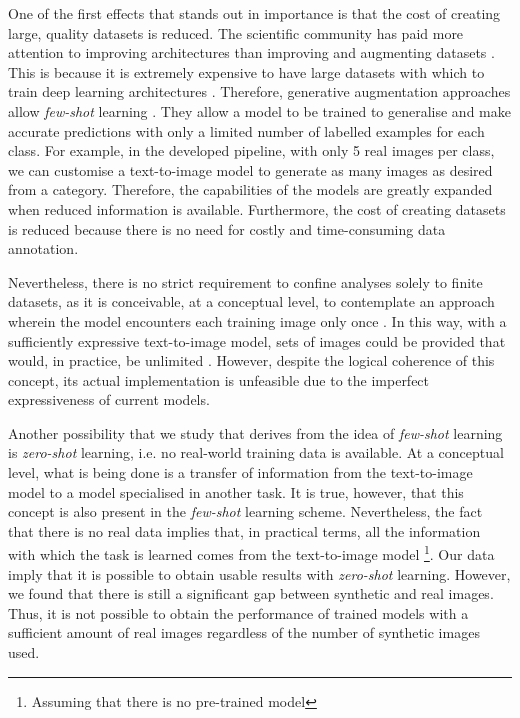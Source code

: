 One of the first effects that stands out in importance is that the cost of creating large, quality datasets is reduced. The scientific community has paid more attention to improving architectures than improving and augmenting datasets \cite{ghiasi2021simple}. This is because it is extremely expensive to have large datasets with which to train deep learning architectures \cite{yang2022image}. Therefore, generative augmentation approaches allow \textit{few-shot} learning \cite{wang2020generalizing}. They allow a model to be trained to generalise and make accurate predictions with only a limited number of labelled examples for each class. For example, in the developed pipeline, with only 5 real images per class, we can customise a text-to-image model to generate as many images as desired from a category. Therefore, the capabilities of the models are greatly expanded when reduced information is available. Furthermore, the cost of creating datasets is reduced because there is no need for costly and time-consuming data annotation.

Nevertheless, there is no strict requirement to confine analyses solely to finite datasets, as it is conceivable, at a conceptual level, to contemplate an approach wherein the model encounters each training image only once \cite{parisi2019continual}. In this way, with a sufficiently expressive text-to-image model, sets of images could be provided that would, in practice, be unlimited \cite{sariyildiz2023fake}. However, despite the logical coherence of this concept, its actual implementation is unfeasible due to the imperfect expressiveness of current models.

Another possibility that we study that derives from the idea of \textit{few-shot} learning is \textit{zero-shot} learning, i.e. no real-world training data is available. At a conceptual level, what is being done is a transfer of information from the text-to-image model to a model specialised in another task. It is true, however, that this concept is also present in the \textit{few-shot} learning scheme. Nevertheless, the fact that there is no real data implies that, in practical terms, all the information with which the task is learned comes from the text-to-image model \footnote{Assuming that there is no pre-trained model}. Our data imply that it is possible to obtain usable results with \textit{zero-shot} learning. However, we found that there is still a significant gap between synthetic and real images. Thus, it is not possible to obtain the performance of trained models with a sufficient amount of real images regardless of the number of synthetic images used.

